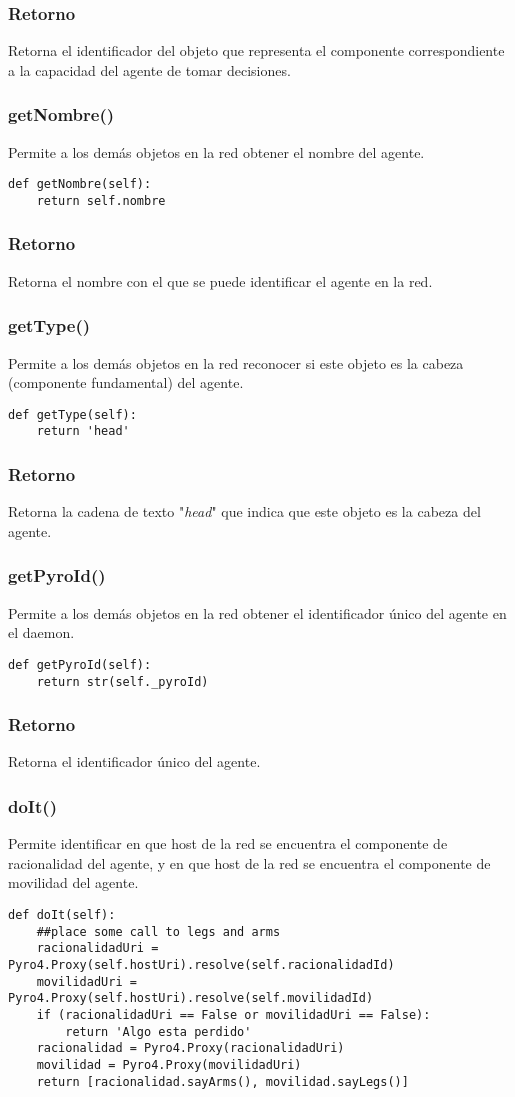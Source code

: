 \documentclass{article}
\begin{document}
\subsubsection*{Retorno}
Retorna el identificador del objeto que representa el componente correspondiente a la capacidad del agente de tomar decisiones.
\subsubsection{\textbf{getNombre}()}
Permite a los demás objetos en la red obtener el nombre del agente.
\begin{lstlisting}
def getNombre(self):
	return self.nombre
\end{lstlisting}
\subsubsection*{Retorno}
Retorna el nombre con el que se puede identificar el agente en la red.
\subsubsection{\textbf{getType}()}
Permite a los demás objetos en la red reconocer si este objeto es la cabeza (componente fundamental) del agente.
\begin{lstlisting}
def getType(self):
	return 'head'
\end{lstlisting}
\subsubsection*{Retorno}
Retorna la cadena de texto "\textit{head}" que indica que este objeto es la cabeza del agente.
\subsubsection{\textbf{getPyroId}()}
Permite a los demás objetos en la red obtener el identificador único del agente en el daemon.
\begin{lstlisting}
def getPyroId(self):
	return str(self._pyroId)
\end{lstlisting}
\subsubsection*{Retorno}
Retorna el identificador único del agente.
\subsubsection{\textbf{doIt}()}
Permite identificar en que host de la red se encuentra el componente de racionalidad del agente, y en que host de la red se encuentra el componente de movilidad del agente.
\begin{lstlisting}
def doIt(self):
	##place some call to legs and arms
	racionalidadUri = Pyro4.Proxy(self.hostUri).resolve(self.racionalidadId)
	movilidadUri =  Pyro4.Proxy(self.hostUri).resolve(self.movilidadId)
	if (racionalidadUri == False or movilidadUri == False):
		return 'Algo esta perdido'
	racionalidad = Pyro4.Proxy(racionalidadUri)
	movilidad = Pyro4.Proxy(movilidadUri)
	return [racionalidad.sayArms(), movilidad.sayLegs()]
\end{lstlisting}
\end{document}
